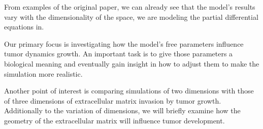 From examples of the original paper, we can already see that the model's results vary with the dimensionality of the space, we are modeling the partial differential equations in. 

Our primary focus is investigating how the model's free parameters influence tumor dynamics growth. An important task is to give those parameters a biological meaning and eventually gain insight in how to adjust them to make the simulation more realistic. 

Another point of interest is comparing simulations of two dimensions with those of three dimensions of extracellular matrix invasion by tumor growth. Additionally to the variation of dimensions, we will briefly examine how the geometry of the extracellular matrix will influence tumor development.